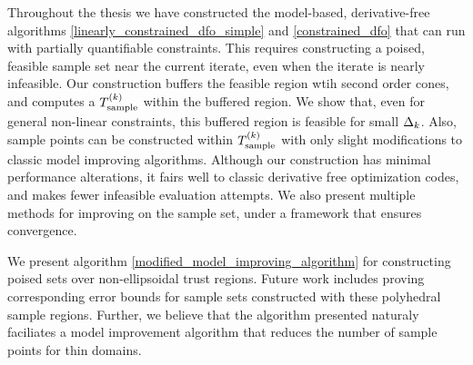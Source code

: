 
Throughout the thesis we have constructed the model-based, derivative-free algorithms \cref{linearly_constrained_dfo_simple} and \cref{constrained_dfo}
that can run with partially quantifiable constraints.
This requires constructing a poised, feasible sample set near the current iterate, even when the iterate is nearly infeasible.
Our construction buffers the feasible region wtih second order cones, and computes a ${T_{\text{sample}}^{(k)}}$ within the buffered region.
We show that, even for general non-linear constraints, this buffered region is feasible for small $\Delta_k$.
Also, sample points can be constructed within ${T_{\text{sample}}^{(k)}}$ with only slight modifications to classic model improving algorithms.
Although our construction has minimal performance alterations, it fairs well to classic derivative free optimization codes,
and makes fewer infeasible evaluation attempts.
We also present multiple methods for improving on the sample set, under a framework that ensures convergence.

We present algorithm \cref{modified_model_improving_algorithm} for constructing poised sets over non-ellipsoidal trust regions.
Future work includes proving corresponding error bounds for sample sets constructed with these polyhedral sample regions.
Further, we believe that the algorithm presented naturaly faciliates a model improvement algorithm that reduces the number of sample points for thin domains.
